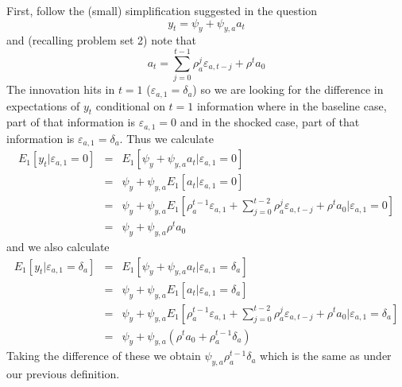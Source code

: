\documentclass[authoryear,11pt]{elsarticle}
\begin{document}
First, follow the (small) simplification suggested in the question
\[
y_{t} = \psi_{y} + \psi_{y,a} a_{t}
\]
and (recalling problem set 2) note that
\[
a_{t} = \sum\limits_{j=0}^{t-1} \rho_{a}^{j} \varepsilon_{a,t-j} + \rho^{t} a_{0}
\]
The innovation hits in $t=1$ ($\varepsilon_{a,1}=\delta_{a}$) so we are looking for the difference in expectations of $y_{t}$ conditional on $t=1$ information where in the baseline case, part of that information is $\varepsilon_{a,1}=0$ and in the shocked case, part of that information is $\varepsilon_{a,1}=\delta_{a}$. Thus we calculate
\begin{eqnarray*}
E_{1} [ y_{t} | \varepsilon_{a,1}=0 ] &=& E_{1} [ \psi_{y} + \psi_{y,a} a_{t} | \varepsilon_{a,1}=0 ] \\
&=& \psi_{y} + \psi_{y,a} E_{1} [  a_{t} | \varepsilon_{a,1}=0 ] \\
&=& \psi_{y} + \psi_{y,a} E_{1} \left[\rho_{a}^{t-1} \varepsilon_{a,1} + \sum\limits_{j=0}^{t-2} \rho_{a}^{j} \varepsilon_{a,t-j} + \rho^{t} a_{0} | \varepsilon_{a,1}=0 \right] \\
&=& \psi_{y} + \psi_{y,a} \rho^{t} a_{0}
\end{eqnarray*}
and we also calculate
\begin{eqnarray*}
E_{1} [ y_{t} | \varepsilon_{a,1}=\delta_{a} ] &=& E_{1} [ \psi_{y} + \psi_{y,a} a_{t} | \varepsilon_{a,1}=\delta_{a} ] \\
&=& \psi_{y} + \psi_{y,a} E_{1} [  a_{t} | \varepsilon_{a,1}=\delta_{a} ] \\
&=& \psi_{y} + \psi_{y,a} E_{1} \left[\rho_{a}^{t-1} \varepsilon_{a,1} + \sum\limits_{j=0}^{t-2} \rho_{a}^{j} \varepsilon_{a,t-j} + \rho^{t} a_{0} | \varepsilon_{a,1}=\delta_{a} \right] \\
&=& \psi_{y} + \psi_{y,a} (\rho^{t} a_{0} + \rho_{a}^{t-1} \delta_{a})
\end{eqnarray*}
Taking the difference of these we obtain $\psi_{y,a} \rho_{a}^{t-1} \delta_{a}$ which is the same as under our previous definition.
\end{document}
